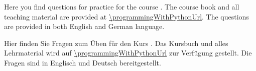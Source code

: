 %
\begin{NoHyper}%
Here you find questions for practice for the course .
The course book and all teaching material are provided at \expandafter\url{\programmingWithPythonUrl}.
The questions are provided in both English and German language.

Hier finden Sie Fragen zum Üben für den Kurs .
Das Kursbuch und alles Lehrmaterial wird auf \expandafter\url{\programmingWithPythonUrl} zur Verfügung gestellt.
Die Fragen sind in Englisch und Deutsch bereitgestellt.%
\end{NoHyper}%
%
